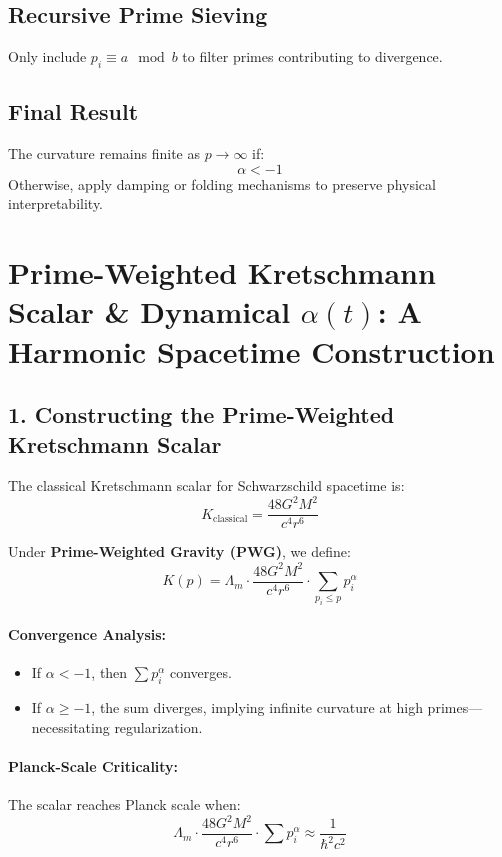 \documentclass{article}
\theoremstyle{plain}
\theoremstyle{claimstyle}
\begin{document}
\subsection{Recursive Prime Sieving}
Only include \( p_i \equiv a \mod b \) to filter primes contributing to divergence.

\subsection{Final Result}
The curvature remains finite as \( p \to \infty \) if:
\[
\boxed{\alpha < -1}
\]
Otherwise, apply damping or folding mechanisms to preserve physical interpretability.


\section{Prime-Weighted Kretschmann Scalar \& Dynamical \(\alpha(t)\): A Harmonic Spacetime Construction}

\subsection*{1. Constructing the Prime-Weighted Kretschmann Scalar}

The classical Kretschmann scalar for Schwarzschild spacetime is:
\[
K_{\text{classical}} = \frac{48 G^2 M^2}{c^4 r^6}
\]

Under \textbf{Prime-Weighted Gravity (PWG)}, we define:
\[
K(p) = \Lambda_m \cdot \frac{48 G^2 M^2}{c^4 r^6} \cdot \sum_{p_i \leq p} p_i^\alpha
\]

\paragraph*{Convergence Analysis:}
\begin{itemize}
    \item If \( \alpha < -1 \), then \( \sum p_i^\alpha \) converges.
    \item If \( \alpha \geq -1 \), the sum diverges, implying infinite curvature at high primes—necessitating regularization.
\end{itemize}

\paragraph*{Planck-Scale Criticality:}
The scalar reaches Planck scale when:
\[
\Lambda_m \cdot \frac{48 G^2 M^2}{c^4 r^6} \cdot \sum p_i^\alpha \approx \frac{1}{\hbar^2 c^2}
\]
\end{document}
